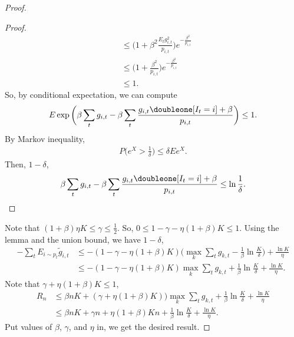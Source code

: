 \begin{proof}
\begin{proof}
\begin{align}
            &\le\Bigg(1+\beta^2 \frac{E_t g_{i,t}^2}{p_{i,t}}\Bigg)e^{-\frac{\beta^2}{p_{i,t}}} \\
            &\le\Bigg(1+ \frac{\beta^2}{p_{i,t}}\Bigg)e^{-\frac{\beta^2}{p_{i,t}}} \\
            &\le 1.
        \end{align}
        So, by conditional expectation, we can compute
        \begin{align}
            E \exp\bigg(\beta\sum_t g_{i,t}-\beta\sum_t\frac{g_{i,t}\doubleone[I_t=i]+\beta}{p_{i,t}}\bigg)\le 1.
        \end{align}
        By Markov inequality,
        \begin{align}
            P\bigg(e^X>\frac{1}{\delta}\bigg) \le \delta E e^X.
        \end{align}
        Then, \wprob $1-\delta$,
        \begin{align}
            \beta\sum_t g_{i,t}-\beta\sum_t\frac{g_{i,t}\doubleone[I_t=i]+\beta}{p_{i,t}}\le\ln \frac{1}{\delta}.
        \end{align}
    \end{proof}
    Note that $(1+\beta)\eta K\le\gamma\le \frac{1}{2}$.
    So, $0\le 1-\gamma-\eta(1+\beta)K\le 1$.
    Using the lemma and the union bound,
    we have \wprob $1-\delta$,
    \begin{align}
        -\sum_t E_{i\sim p_t}\tilde g_{i, t}
            &\le -(1-\gamma-\eta(1+\beta)K)\bigg(\max_k\sum_t g_{k,t} -\frac{1}{\beta}\ln\frac{K}{\delta} \bigg)+ \frac{\ln K}{\eta} \\
            &\le -(1-\gamma-\eta(1+\beta)K)\max_k\sum_t g_{k,t} +\frac{1}{\beta}\ln\frac{K}{\delta}+ \frac{\ln K}{\eta}.
    \end{align}
    Note that $\gamma+\eta(1+\beta)K\le 1$,
    \begin{align}
        R_n
            &\le\beta nK + (\gamma+\eta(1+\beta)K))\max_k\sum_t g_{k,t}+\frac{1}{\beta}\ln\frac{K}{\delta}+ \frac{\ln K}{\eta} \\
            &\le \beta nK + \gamma n+\eta(1+\beta)Kn+\frac{1}{\beta}\ln\frac{K}{\delta}+ \frac{\ln K}{\eta}.
    \end{align}
    Put values of $\beta$, $\gamma$, and $\eta$ in,
    we get the desired result.
\end{proof}
